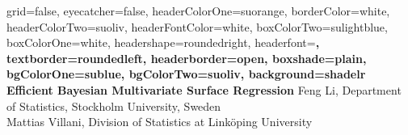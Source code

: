 \documentclass[a0paper,portrait,fontscale = 0.32,margin=1.5em]{baposter/baposter}
\begin{document}


\begin{poster}{
    grid=false,
    eyecatcher=false,
    headerColorOne=suorange,
    borderColor=white,
    headerColorTwo=suoliv,
    headerFontColor=white,
    boxColorTwo=sulightblue,
    boxColorOne=white,
    headershape=roundedright,
    headerfont=\Large\sf\bf,
    textborder=roundedleft,
    headerborder=open,
    boxshade=plain,
    bgColorOne=sublue,
    bgColorTwo=suoliv,
    background=shadelr
}
{
}
{\sf \bf \Huge
{\color{white} \Huge \textbf{Efficient Bayesian Multivariate Surface Regression}}
}
{
{\color{suorange} {\newline  \sc Feng Li, Department of Statistics, Stockholm University, Sweden}\\[0.50em]
  \sc Mattias Villani,  Division of Statistics at Linköping University}
}
{
\setlength\fboxsep{0pt}
\setlength\fboxrule{0.0pt}
      }

{

}
\end{poster}
\end{document}
